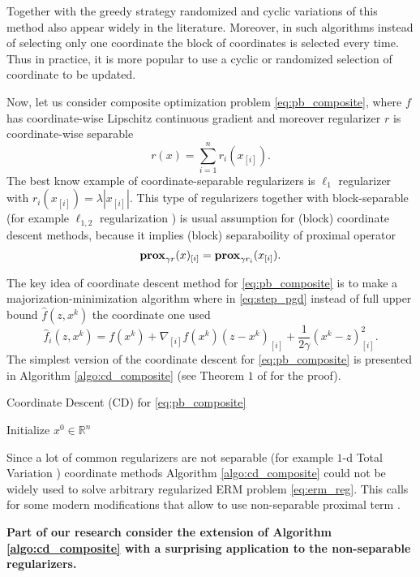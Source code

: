 Together with the greedy strategy randomized and cyclic variations of this method also appear widely in the literature. Moreover, in such algorithms instead of selecting only one coordinate the block of coordinates is selected every time. Thus in practice, it is more popular to use a cyclic or randomized selection of coordinate to be updated.

Now, let us consider composite optimization problem \eqref{eq:pb_composite}, where $f$ has coordinate-wise Lipschitz continuous gradient and moreover regularizer $r$ is coordinate-wise separable
$$
r(x) = \sum_{i=1}^nr_i(x_{[i]}).
$$
The best know example of coordinate-separable regularizers is $\ell_1$ regularizer with $r_i(x_{[i]}) = \lambda |x_{[i]}|$. This type of regularizers together with block-separable (for example $\ell_{1,2}$ regularization \cite{bach2012optimization}) is usual assumption for (block) coordinate descent methods, because it implies (block) separaboility of proximal operator
$$
\mathbf{prox}_{\gamma r}(x)_{[i]} = \mathbf{prox}_{\gamma r_i}(x_{[i]}).
$$

The key idea of coordinate descent method for \eqref{eq:pb_composite} is to make a majorization-minimization algorithm where in \eqref{eq:step_pgd} instead of full upper bound $\hat{f}(z, x^k)$ the coordinate one used
$$
\hat{f}_i(z, x^k) = f(x^k) + \nabla_{[i]} f(x^k) (z-x^k)_{[i]}+\frac{1}{2\gamma}(x^k-z)_{[i]}^2.
$$
The simplest version of the coordinate descent for \eqref{eq:pb_composite} is presented in Algorithm \ref{algo:cd_composite} (see Theorem $1$ of \cite{richtarik2012efficient} for the proof).

\begin{algorithm}
    \caption{Coordinate Descent (CD) for \eqref{eq:pb_composite}}
    \label{algo:cd_composite}
    \begin{algorithmic}
        \STATE Initialize $x^0\in\mathbb{R}^n$
        \ENDFOR
    \end{algorithmic}
\end{algorithm}

Since a lot of common regularizers are not separable (for example $1$-d Total Variation \cite{bach2012optimization}) coordinate methods Algorithm \ref{algo:cd_composite} could not be widely used to solve arbitrary regularized ERM problem \eqref{eq:erm_reg}. This calls for some modern modifications that allow to use non-separable proximal term \cite{hanzely2018sega}. 

{\color{red}\textbf{Part of our research consider the extension of Algorithm \ref{algo:cd_composite} with a surprising application to the non-separable regularizers.}}